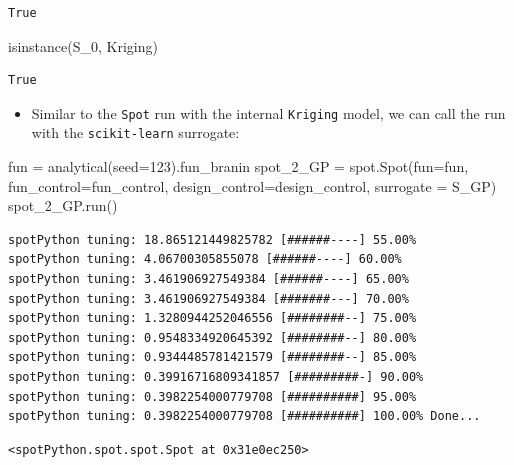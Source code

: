 \documentclass[
  letterpaper,
  DIV=11,
  numbers=noendperiod]{scrreprt}
\newenvironment{Shaded}{\begin{snugshade}}{\end{snugshade}}
\newcommand{\BuiltInTok}[1]{\textcolor[rgb]{0.00,0.23,0.31}{#1}}
\newcommand{\DecValTok}[1]{\textcolor[rgb]{0.68,0.00,0.00}{#1}}
\newcommand{\NormalTok}[1]{\textcolor[rgb]{0.00,0.23,0.31}{#1}}
\newcommand{\OperatorTok}[1]{\textcolor[rgb]{0.37,0.37,0.37}{#1}}
\providecommand{\tightlist}{%
  \setlength{\itemsep}{0pt}\setlength{\parskip}{0pt}}\usepackage{longtable,booktabs,array}
\begin{document}
\begin{verbatim}
True
\end{verbatim}

\begin{Shaded}
\begin{Highlighting}[]
\BuiltInTok{isinstance}\NormalTok{(S\_0, Kriging)}
\end{Highlighting}
\end{Shaded}

\begin{verbatim}
True
\end{verbatim}

\begin{itemize}
\tightlist
\item
  Similar to the \texttt{Spot} run with the internal \texttt{Kriging}
  model, we can call the run with the \texttt{scikit-learn} surrogate:
\end{itemize}

\begin{Shaded}
\begin{Highlighting}[]
\NormalTok{fun }\OperatorTok{=}\NormalTok{ analytical(seed}\OperatorTok{=}\DecValTok{123}\NormalTok{).fun\_branin}
\NormalTok{spot\_2\_GP }\OperatorTok{=}\NormalTok{ spot.Spot(fun}\OperatorTok{=}\NormalTok{fun,}
\NormalTok{                     fun\_control}\OperatorTok{=}\NormalTok{fun\_control,}
\NormalTok{                     design\_control}\OperatorTok{=}\NormalTok{design\_control,}
\NormalTok{                     surrogate }\OperatorTok{=}\NormalTok{ S\_GP)}
\NormalTok{spot\_2\_GP.run()}
\end{Highlighting}
\end{Shaded}

\begin{verbatim}
spotPython tuning: 18.865121449825782 [######----] 55.00% 
spotPython tuning: 4.06700305855078 [######----] 60.00% 
spotPython tuning: 3.461906927549384 [######----] 65.00% 
spotPython tuning: 3.461906927549384 [#######---] 70.00% 
spotPython tuning: 1.3280944252046556 [########--] 75.00% 
spotPython tuning: 0.9548334920645392 [########--] 80.00% 
spotPython tuning: 0.9344485781421579 [########--] 85.00% 
spotPython tuning: 0.39916716809341857 [#########-] 90.00% 
spotPython tuning: 0.3982254000779708 [##########] 95.00% 
spotPython tuning: 0.3982254000779708 [##########] 100.00% Done...
\end{verbatim}

\begin{verbatim}
<spotPython.spot.spot.Spot at 0x31e0ec250>
\end{verbatim}
\end{document}
